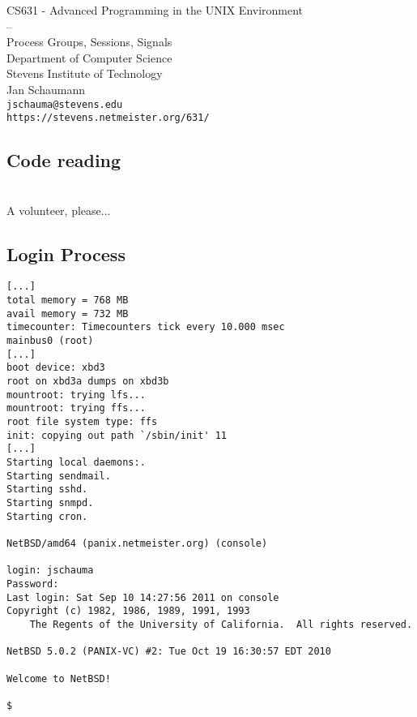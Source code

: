 \documentclass[xga]{xdvislides}
\begin{document}
\setfontphv

\lhead{\slidetitle}
\cfoot{\relax}
\rfoot{\Gray{\today}}

\vspace*{\fill}
\begin{center}
	\Hugesize
		CS631 - Advanced Programming in the UNIX Environment\\
		-- \\
		Process Groups, Sessions, Signals
	\hspace*{5mm}\blueline\\ [1em]
	\Normalsize
		Department of Computer Science\\
		Stevens Institute of Technology\\
		Jan Schaumann\\
		\verb+jschauma@stevens.edu+\\
		\verb+https://stevens.netmeister.org/631/+
\end{center}
\vspace*{\fill}

\subsection{Code reading}
\vspace{1in}
\\

\Huge
A volunteer, please...
\Normalsize

\subsection{Login Process}
\small
\begin{verbatim}
[...]
total memory = 768 MB
avail memory = 732 MB
timecounter: Timecounters tick every 10.000 msec
mainbus0 (root)
[...]
boot device: xbd3
root on xbd3a dumps on xbd3b
mountroot: trying lfs...
mountroot: trying ffs...
root file system type: ffs
init: copying out path `/sbin/init' 11
[...]
Starting local daemons:.
Starting sendmail.
Starting sshd.
Starting snmpd.
Starting cron.

NetBSD/amd64 (panix.netmeister.org) (console)

login: jschauma
Password:
Last login: Sat Sep 10 14:27:56 2011 on console
Copyright (c) 1982, 1986, 1989, 1991, 1993
    The Regents of the University of California.  All rights reserved.

NetBSD 5.0.2 (PANIX-VC) #2: Tue Oct 19 16:30:57 EDT 2010

Welcome to NetBSD!

$
\end{verbatim}
\Normalsize
\end{document}
